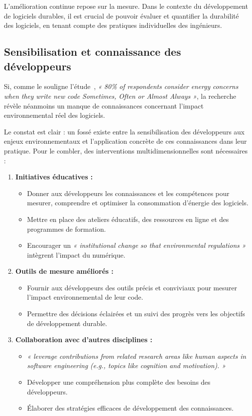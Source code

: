 
L'amélioration continue repose sur la mesure. Dans le contexte du développement de logiciels durables, il est crucial de pouvoir évaluer et quantifier la durabilité des logiciels, en tenant compte des pratiques individuelles des ingénieurs.

\subsection{Sensibilisation et connaissance des développeurs}
Si, comme le souligne l'étude~\cite{EmpiricalStudy}, \emph{« 80\% of respondents consider energy concerns when they write new code Sometimes, Often or Almost Always »}, la recherche révèle néanmoins un manque de connaissances concernant l'impact environnemental réel des logiciels.

Le constat est clair : un fossé existe entre la sensibilisation des développeurs aux enjeux environnementaux et l'application concrète de ces connaissances dans leur pratique. Pour le combler, des interventions multidimensionnelles sont nécessaires :
\begin{enumerate}
    \item \textbf{Initiatives éducatives :} 
    \begin{itemize}
        \item Donner aux développeurs les connaissances et les compétences pour mesurer, comprendre et optimiser la consommation d'énergie des logiciels.
        \item Mettre en place des ateliers éducatifs, des ressources en ligne et des programmes de formation.
        \item Encourager un \emph{« institutional change so that environmental regulations »} intègrent l'impact du numérique.~\cite{SafetySecuritySustainability}
    \end{itemize}
    \item \textbf{Outils de mesure améliorés :}
    \begin{itemize}
        \item Fournir aux développeurs des outils précis et conviviaux pour mesurer l'impact environnemental de leur code.
        \item Permettre des décisions éclairées et un suivi des progrès vers les objectifs de développement durable.
    \end{itemize}
    \item \textbf{Collaboration avec d'autres disciplines :}
    \begin{itemize}
        \item \emph{« leverage contributions from related research areas like human aspects in software engineering (e.g., topics like cognition and motivation). »}~\cite{SafetySecuritySustainability}
        \item Développer une compréhension plus complète des besoins des développeurs.
        \item Élaborer des stratégies efficaces de développement des connaissances.
    \end{itemize}
\end{enumerate}



